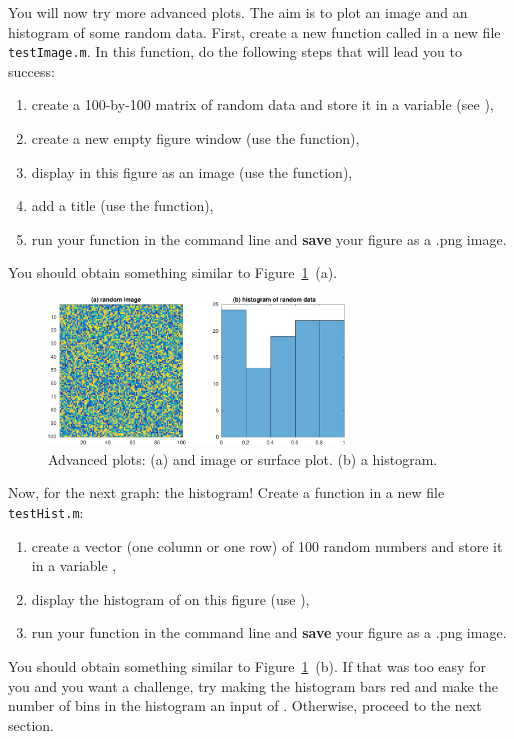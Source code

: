 \documentclass{article}
\begin{document}
You will now try more advanced plots.
The aim is to plot an image and an histogram of some random data.
First, create a new function called  in a new file \texttt{testImage.m}.
In this function, do the following steps that will lead you to success:
\begin{enumerate}
  \item create a 100-by-100 matrix of random data and store it in a variable  (see ),
  \item create a new empty figure window (use the  function),
  \item display in this figure  as an image (use the  function),
  \item add a title (use the  function),
  \item run your function in the command line and \textbf{save} your figure as a .png image.
\end{enumerate}
You should obtain something similar to Figure~\ref{fig:adv}~(a).

\begin{figure}[h]
  \centering
  \includegraphics[width=0.7\textwidth]{figs/advancedplot.pdf}
  \caption{Advanced plots: (a) and image or surface plot. (b) a histogram.}\label{fig:adv}
\end{figure}

Now, for the next graph: the histogram! Create a  function in a new file \texttt{testHist.m}:
\begin{enumerate}
  \item create a vector (one column or one row) of 100 random numbers and store it in a variable ,
  \item display the histogram of  on this figure (use ),
  \item run your function in the command line and \textbf{save} your figure as a .png image.
\end{enumerate}
You should obtain something similar to Figure~\ref{fig:adv}~(b).
If that was too easy for you and you want a challenge, try making the histogram bars red and make the number of bins in the histogram an input of .
Otherwise, proceed to the next section.
\end{document}
